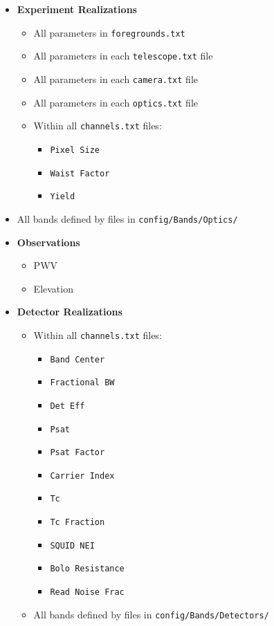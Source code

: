 \documentclass[11pt]{article} %
\begin{document}
\begin{itemize}[noitemsep,topsep=0pt]
	\item \textbf{Experiment Realizations}
		\begin{itemize}[noitemsep,topsep=0pt]
		\item All parameters in \texttt{foregrounds.txt}
		\item All parameters in each  \texttt{telescope.txt} file
		\item All parameters in each \texttt{camera.txt} file
		\item All parameters in each \texttt{optics.txt} file
		\item Within all \texttt{channels.txt} files:
			\begin{itemize}[noitemsep,topsep=0pt]
			\item \texttt{Pixel Size}
			\item \texttt{Waist Factor}
			\item \texttt{Yield}
			\end{itemize}
		\end{itemize}
		\item All bands defined by files in \texttt{config/Bands/Optics/}
	\item \textbf{Observations}
		\begin{itemize}[noitemsep,topsep=0pt]
		\item PWV
		\item Elevation
		\end{itemize}
	\item \textbf{Detector Realizations}
		\begin{itemize}[noitemsep,topsep=0pt]
		\item Within all \texttt{channels.txt} files:
			\begin{itemize}[noitemsep,topsep=0pt]
			\item \texttt{Band Center}
			\item \texttt{Fractional BW}
			\item \texttt{Det Eff}
			\item \texttt{Psat}
			\item \texttt{Psat Factor}
			\item \texttt{Carrier Index}
			\item \texttt{Tc}
			\item \texttt{Tc Fraction}
			\item \texttt{SQUID NEI}
			\item \texttt{Bolo Resistance}
			\item \texttt{Read Noise Frac}
			\end{itemize}
		\item All bands defined by files in \texttt{config/Bands/Detectors/}
		\end{itemize}
\end{itemize}
		
\end{document}
